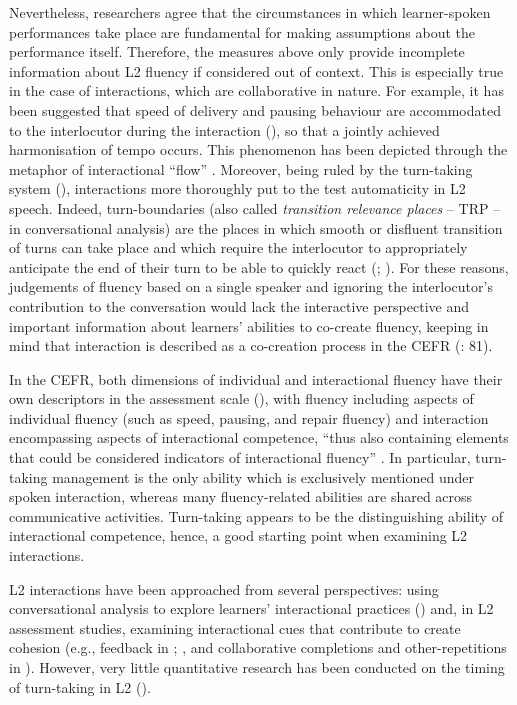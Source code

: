 Nevertheless, researchers agree that the circumstances in which learner-spoken performances take place are fundamental for making assumptions about the performance itself. Therefore, the measures above only provide incomplete information about L2 fluency if considered out of context. This is especially true in the case of interactions, which are collaborative in nature. For example, it has been suggested that speed of delivery and pausing behaviour are accommodated to the interlocutor during the interaction (\citealt{KousidisDorran2009}), so that a jointly achieved harmonisation of tempo occurs. This phenomenon has been depicted through the metaphor of interactional “flow” \citep{McCarthy2009}. Moreover, being ruled by the turn-taking system (\citealt{SacksSchegloffJefferson1974}), interactions more thoroughly put to the test automaticity in L2 speech. Indeed, turn-boundaries (also called \textit{transition relevance places} – TRP – in conversational analysis) are the places in which smooth or disfluent transition of turns can take place and which require the interlocutor to appropriately anticipate the end of their turn to be able to quickly react (\citealt{BögelsTorreira2015}; \citealt{Levinson2016}). For these reasons, judgements of fluency based on a single speaker and ignoring the interlocutor’s contribution to the conversation would lack the interactive perspective and important information about learners’ abilities to co-create fluency, keeping in mind that interaction is described as a co-creation process in the CEFR (\citealt{PiccardoEtAl2018}: 81). 

In the CEFR, both dimensions of individual and interactional fluency have their own descriptors in the assessment scale (\citealt[28–29]{CouncilOfEurope2001}), with fluency including aspects of individual fluency (such as speed, pausing, and repair fluency) and interaction encompassing aspects of interactional competence, “thus also containing elements that could be considered indicators of interactional fluency” \citep[30]{Peltonen2017}. In particular, turn-taking management is the only ability which is exclusively mentioned under spoken interaction, whereas many fluency-related abilities are shared across communicative activities. Turn-taking appears to be the distinguishing ability of interactional competence, hence, a good starting point when examining L2 interactions.

L2 interactions have been approached from several perspectives: using conversational analysis to explore learners’ interactional practices (\citealt{DoehlerBerger2015,DoehlerBerger2018}) and, in L2 assessment studies, examining interactional cues that contribute to create cohesion (e.g., feedback in \citealt{Galaczi2014}; \citealt{MayEtAl2020}, and collaborative completions and other-repetitions in \citealt{Peltonen2017}). However, very little quantitative research has been conducted on the timing of turn-taking in L2 (\citealt{SørensenEtAl2021}).

